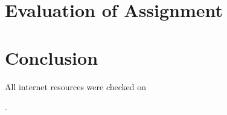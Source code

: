\documentclass{article}
\begin{document}
\newpage
\part{Evaluation of Assignment}

    

\newpage
\part{Conclusion}

    

\newpage

{}

\nocite{*}
All internet resources were checked on \date{2013-03-14}.
\end{document}
